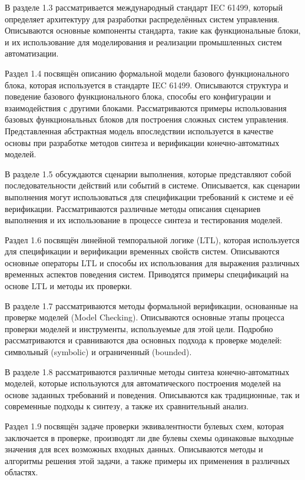 В разделе 1.3 рассматривается международный стандарт IEC 61499, который определяет архитектуру для разработки распределённых систем управления.
Описываются основные компоненты стандарта, такие как функциональные блоки, и их использование для моделирования и реализации промышленных систем автоматизации.

Раздел 1.4 посвящён описанию формальной модели базового функционального блока, которая используется в стандарте IEC 61499.
Описываются структура и поведение базового функционального блока, способы его конфигурации и взаимодействия с другими блоками.
Рассматриваются примеры использования базовых функциональных блоков для построения сложных систем управления.
Представленная абстрактная модель впоследствии используется в качестве основы при разработке методов синтеза и верификации конечно-автоматных моделей.

В разделе 1.5 обсуждаются сценарии выполнения, которые представляют собой последовательности действий или событий в системе. Описывается, как сценарии выполнения могут использоваться для спецификации требований к системе и её верификации. Рассматриваются различные методы описания сценариев выполнения и их использование в процессе синтеза и тестирования моделей.

Раздел 1.6 посвящён линейной темпоральной логике (LTL), которая используется для спецификации и верификации временных свойств систем. Описываются основные операторы LTL и способы их использования для выражения различных временных аспектов поведения систем. Приводятся примеры спецификаций на основе LTL и методы их проверки.

В разделе 1.7 рассматриваются методы формальной верификации, основанные на проверке моделей (Model Checking).
Описываются основные этапы процесса проверки моделей и инструменты, используемые для этой цели.
Подробно рассматриваются и сравниваются два основных подхода к проверке моделей: символьный (symbolic) и ограниченный (bounded).

В разделе 1.8 рассматриваются различные методы синтеза конечно-автоматных моделей, которые используются для автоматического построения моделей на основе заданных требований и поведения. Описываются как традиционные, так и современные подходы к синтезу, а также их сравнительный анализ.

Раздел 1.9 посвящён задаче проверки эквивалентности булевых схем, которая заключается в проверке, производят ли две булевы схемы одинаковые выходные значения для всех возможных входных данных. Описываются методы и алгоритмы решения этой задачи, а также примеры их применения в различных областях.

